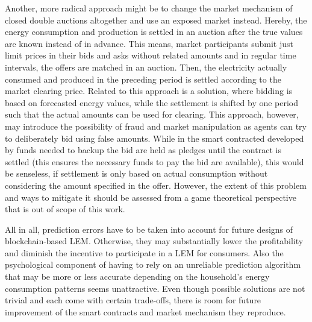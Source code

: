 Another, more radical approach might be to change the market mechanism of closed double auctions altogether and use an exposed market instead. Hereby, the energy consumption and production is settled in an auction after the true values are known instead of in advance. This means, market participants submit just limit prices in their bids and asks without related amounts and in regular time intervals, the offers are matched in an auction. Then, the electricity actually consumed and produced in the preceding period is settled according to the market clearing price. Related to this approach is a solution, where bidding is based on forecasted energy values, while the settlement is shifted by one period such that the actual amounts can be used for clearing. This approach, however, may introduce the possibility of fraud and market manipulation as agents can try to deliberately bid using false amounts. While in the smart contracted developed by \citet{Mengelkamp:2018a} funds needed to backup the bid are held as pledges until the contract is settled (this ensures the necessary funds to pay the bid are available), this would be senseless, if settlement is only based on actual consumption without considering the amount specified in the offer. However, the extent of this problem and ways to mitigate it should be assessed from a game theoretical perspective that is out of scope of this work.

All in all, prediction errors have to be taken into account for future designs of blockchain-based LEM. Otherwise, they may substantially lower the profitability and diminish the incentive to participate in a LEM for consumers. Also the psychological component of having to rely on an unreliable prediction algorithm that may be more or less accurate depending on the household's energy consumption patterns seems unattractive. Even though possible solutions are not trivial and each come with certain trade-offs, there is room for future improvement of the smart contracts and market mechanism they reproduce.

